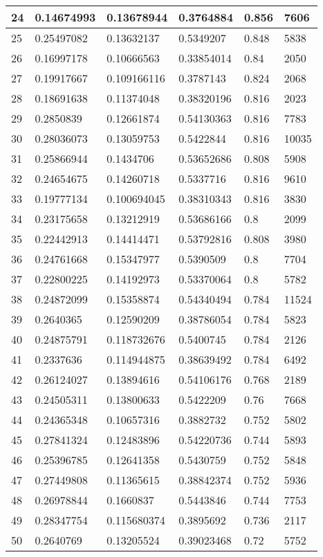 \begin{longtable}{|l|l|l|l|l|l|}
24 & 0.14674993 & 0.13678944 & 0.3764884 & 0.856 & 7606 \\ \hline 
25 & 0.25497082 & 0.13632137 & 0.5349207 & 0.848 & 5838 \\ \hline 
26 & 0.16997178 & 0.10666563 & 0.33854014 & 0.84 & 2050 \\ \hline 
27 & 0.19917667 & 0.109166116 & 0.3787143 & 0.824 & 2068 \\ \hline 
28 & 0.18691638 & 0.11374048 & 0.38320196 & 0.816 & 2023 \\ \hline 
29 & 0.2850839 & 0.12661874 & 0.54130363 & 0.816 & 7783 \\ \hline 
30 & 0.28036073 & 0.13059753 & 0.5422844 & 0.816 & 10035 \\ \hline 
31 & 0.25866944 & 0.1434706 & 0.53652686 & 0.808 & 5908 \\ \hline 
32 & 0.24654675 & 0.14260718 & 0.5337716 & 0.816 & 9610 \\ \hline 
33 & 0.19777134 & 0.100694045 & 0.38310343 & 0.816 & 3830 \\ \hline 
34 & 0.23175658 & 0.13212919 & 0.53686166 & 0.8 & 2099 \\ \hline 
35 & 0.22442913 & 0.14414471 & 0.53792816 & 0.808 & 3980 \\ \hline 
36 & 0.24761668 & 0.15347977 & 0.5390509 & 0.8 & 7704 \\ \hline 
37 & 0.22800225 & 0.14192973 & 0.53370064 & 0.8 & 5782 \\ \hline 
38 & 0.24872099 & 0.15358874 & 0.54340494 & 0.784 & 11524 \\ \hline 
39 & 0.2640365 & 0.12590209 & 0.38786054 & 0.784 & 5823 \\ \hline 
40 & 0.24875791 & 0.118732676 & 0.5400745 & 0.784 & 2126 \\ \hline 
41 & 0.2337636 & 0.114944875 & 0.38639492 & 0.784 & 6492 \\ \hline 
42 & 0.26124027 & 0.13894616 & 0.54106176 & 0.768 & 2189 \\ \hline 
43 & 0.24505311 & 0.13800633 & 0.5422209 & 0.76 & 7668 \\ \hline 
44 & 0.24365348 & 0.10657316 & 0.3882732 & 0.752 & 5802 \\ \hline 
45 & 0.27841324 & 0.12483896 & 0.54220736 & 0.744 & 5893 \\ \hline 
46 & 0.25396785 & 0.12641358 & 0.5430759 & 0.752 & 5848 \\ \hline 
47 & 0.27449808 & 0.11365615 & 0.38842374 & 0.752 & 5936 \\ \hline 
48 & 0.26978844 & 0.1660837 & 0.5443846 & 0.744 & 7753 \\ \hline 
49 & 0.28347754 & 0.115680374 & 0.3895692 & 0.736 & 2117 \\ \hline 
50 & 0.2640769 & 0.13205524 & 0.39023468 & 0.72 & 5752 \\ \hline 
\end{longtable}
